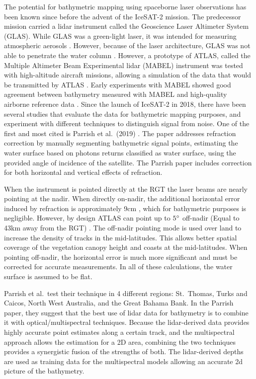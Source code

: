 The potential for bathymetric mapping using spaceborne laser observations has been known since before the advent of the IceSAT-2 mission. The predecessor mission carried a lidar instrument called the Geoscience Laser Altimeter System (GLAS). While GLAS was a green-light laser, it was intended for measuring atmospheric aerosols \parencite{Abshire2005}. However, because of the laser architecture, GLAS was not able to penetrate the water column \parencite{Forfinski-Sarkozi2016}. However, a prototype of ATLAS, called the Multiple Altimeter Beam Experimental lidar (MABEL) instrument was tested with high-altitude aircraft missions, allowing a simulation of the data that would be transmitted by ATLAS \parencite{Mcgill2013}. Early experiments with MABEL showed good agreement between bathymetry measured with MABEL and high-quality airborne reference data \parencite{Jasinski2016,Forfinski-Sarkozi2016}. Since the launch of IceSAT-2 in 2018, there have been several studies that evaluate the data for bathymetric mapping purposes, and experiment with different techniques to distinguish signal from noise. One of the first and most cited is Parrish et al.~(2019) \parencite{Parrish2019}. The paper addresses refraction correction by manually segmenting bathymetric signal points, estimating the water surface based on photons returns classified as water surface, using the provided angle of incidence of the satellite. The Parrish paper includes correction for both horizontal and vertical effects of refraction.

When the instrument is pointed directly at the RGT the laser beams are nearly pointing at the nadir. When directly on-nadir, the additional horizontal error induced by refraction is approximately 9cm \parencite{Parrish2019}, which for bathymetric purposes is negligible. However, by design ATLAS can point up to $5 \degree$ off-nadir (Equal to 43km away from the RGT) \parencite{Magruder2021}. The off-nadir pointing mode is used over land to increase the density of tracks in the mid-latitudes. This allows better spatial coverage of the vegetation canopy height and coasts at the mid-latitudes. When pointing off-nadir, the horizontal error is much more significant and must be corrected for accurate measurements. In all of these calculations, the water surface is assumed to be flat.

Parrish et al.~test their technique in 4 different regions: St.~Thomas, Turks and Caicos, North West Australia, and the Great Bahama Bank. In the Parrish paper, they suggest that the best use of lidar data for bathymetry is to combine it with optical/multispectral techniques. Because the lidar-derived data provides highly accurate point estimates along a certain track, and the multispectral approach allows the estimation for a 2D area, combining the two techniques provides a synergistic fusion of the strengths of both. The lidar-derived depths are used as training data for the multispectral models allowing an accurate 2d picture of the bathymetry.

